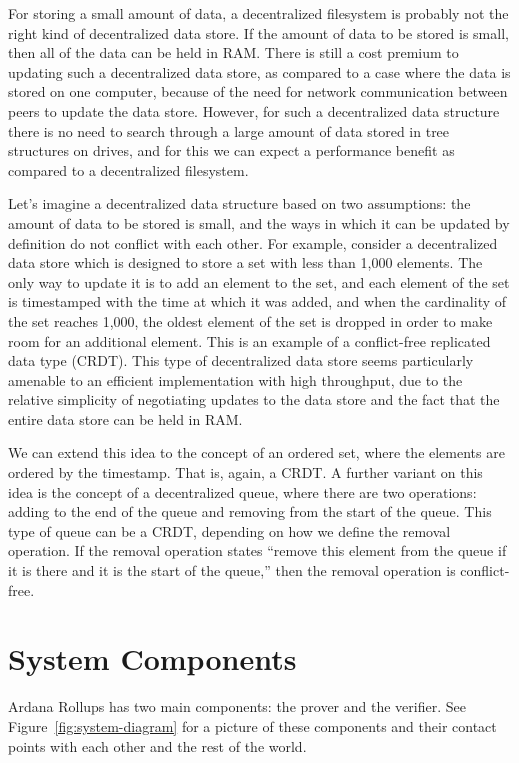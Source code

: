 \documentclass[12pt]{article}
\begin{document}
For storing a small amount of data, a decentralized filesystem is probably not the right kind of decentralized data store. If the amount of data to be stored is small, then all of the data can be held in RAM. There is still a cost premium to updating such a decentralized data store, as compared to a case where the data is stored on one computer, because of the need for network communication between peers to update the data store. However, for such a decentralized data structure there is no need to search through a large amount of data stored in tree structures on drives, and for this we can expect a performance benefit as compared to a decentralized filesystem.

Let's imagine a decentralized data structure based on two assumptions: the amount of data to be stored is small, and the ways in which it can be updated by definition do not conflict with each other. For example, consider a decentralized data store which is designed to store a set with less than 1,000 elements. The only way to update it is to add an element to the set, and each element of the set is timestamped with the time at which it was added, and when the cardinality of the set reaches 1,000, the oldest element of the set is dropped in order to make room for an additional element. This is an example of a conflict-free replicated data type (CRDT). This type of decentralized data store seems particularly amenable to an efficient implementation with high throughput, due to the relative simplicity of negotiating updates to the data store and the fact that the entire data store can be held in RAM.

We can extend this idea to the concept of an ordered set, where the elements are ordered by the timestamp. That is, again, a CRDT. A further variant on this idea is the concept of a decentralized queue, where there are two operations: adding to the end of the queue and removing from the start of the queue. This type of queue can be a CRDT, depending on how we define the removal operation. If the removal operation states ``remove this element from the queue if it is there and it is the start of the queue,'' then the removal operation is conflict-free.


\section{System Components}

Ardana Rollups has two main components: the prover and the verifier. See Figure~\ref{fig:system-diagram} for a picture of these components and their contact points with each other and the rest of the world.
\end{document}
